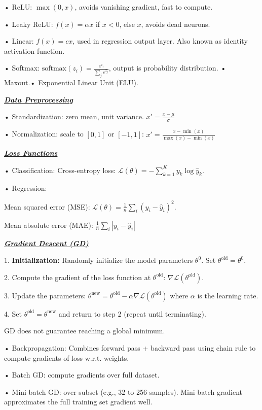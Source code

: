 \documentclass[10pt]{article}
\newcommand{\bulletPoint}[1]{\ul{\textit{\textbf{#1}}}}
\begin{document}
\begin{multicols*}{3}
• ReLU: $\max(0, x)$, avoids vanishing gradient, fast to compute. \quad

• Leaky ReLU: $f(x) = \alpha x$ if $x < 0$, else $x$, avoids dead neurons. \quad

• Linear: $f(x) = cx$, used in regression output layer. 
Also known as identity activation function.

• Softmax: $\text{softmax}(z_i) = \frac{e^{z_i}}{\sum_j e^{z_j}}$, output is probability distribution.\quad
• Maxout.\quad • Exponential Linear Unit (ELU). 

\bulletPoint{Data Preprocessing} \quad

• Standardization: zero mean, unit variance. \quad
$x' = \frac{x - \mu}{\sigma}$ \quad

• Normalization: scale to $[0, 1]$ or $[-1, 1]$: $x' = \frac{x - \min(x)}{\max(x) - \min(x)}$

\bulletPoint{Loss Functions} \quad

• Classification: Cross-entropy loss: 
$\mathcal{L}(\theta) = -\sum_{k=1}^K y_k \log \hat{y}_k$. 

• Regression: 

Mean squared error (MSE): $\mathcal{L}(\theta) = \frac{1}{n} \sum_i (y_i - \hat{y}_i)^2$. 

Mean absolute error (MAE): $\frac{1}{n} \sum_i |y_i - \hat{y}_i|$

\bulletPoint{Gradient Descent (GD)} \quad

1. \textbf{Initialization:} Randomly initialize the model parameters $\theta^0$. Set $\theta^{\text{old}} = \theta^0$.

2. Compute the gradient of the loss function at $\theta^{\text{old}}$: $\nabla \mathcal{L}(\theta^{\text{old}})$.

3. Update the parameters:
$\theta^{\text{new}} = \theta^{\text{old}} - \alpha \nabla \mathcal{L}(\theta^{\text{old}})$
where $\alpha$ is the learning rate.

4. Set $\theta^{\text{old}} = \theta^{\text{new}}$ and return to step 2 (repeat until terminating).

GD does not guarantee reaching a global minimum.

• Backpropagation: Combines forward pass + backward pass using chain rule to compute gradients of loss w.r.t. weights. 

• Batch GD: compute gradients over full dataset. 

• Mini-batch GD: over subset (e.g., 32 to 256 samples). Mini-batch gradient approximates the full training set gradient well.


\end{multicols*}
\end{document}

